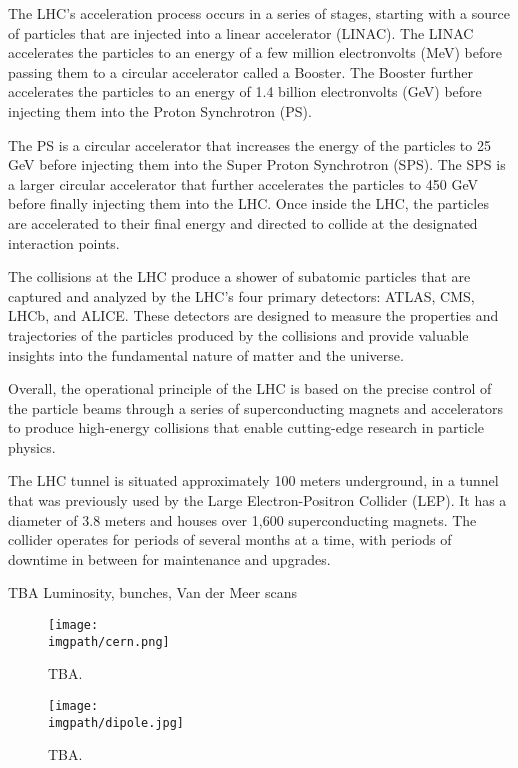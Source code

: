 The LHC's acceleration process occurs in a series of stages, starting with a source of particles that are injected into a linear accelerator (LINAC). The LINAC accelerates the particles to an energy of a few million electronvolts (MeV) before passing them to a circular accelerator called a Booster. The Booster further accelerates the particles to an energy of 1.4 billion electronvolts (GeV) before injecting them into the Proton Synchrotron (PS).

The PS is a circular accelerator that increases the energy of the particles to 25 GeV before injecting them into the Super Proton Synchrotron (SPS). The SPS is a larger circular accelerator that further accelerates the particles to 450 GeV before finally injecting them into the LHC. Once inside the LHC, the particles are accelerated to their final energy and directed to collide at the designated interaction points.

The collisions at the LHC produce a shower of subatomic particles that are captured and analyzed by the LHC's four primary detectors: ATLAS, CMS, LHCb, and ALICE. These detectors are designed to measure the properties and trajectories of the particles produced by the collisions and provide valuable insights into the fundamental nature of matter and the universe.

Overall, the operational principle of the LHC is based on the precise control of the particle beams through a series of superconducting magnets and accelerators to produce high-energy collisions that enable cutting-edge research in particle physics.

The LHC tunnel is situated approximately 100 meters underground, in a tunnel that was previously used by the Large Electron-Positron Collider (LEP). It has a diameter of 3.8 meters and houses over 1,600 superconducting magnets. The collider operates for periods of several months at a time, with periods of downtime in between for maintenance and upgrades.

TBA Luminosity, bunches, Van der Meer scans

\begin{figure}%
\centering%
\texttt{[image: \\imgpath/cern.png]}
\caption{TBA.}
\label{fig:experiment:cern}
\end{figure}


\begin{figure}%
\centering%
\texttt{[image: \\imgpath/dipole.jpg]}
\caption{TBA.}
\label{fig:experiment:cern}
\end{figure}
